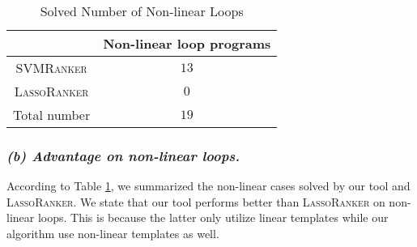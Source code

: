 \documentclass[UTF-8]{article}
\begin{document}
\begin{table}
\centering
\begin{tabular}{c|c}
& Non-linear loop programs \\
\hline
\textsc{SVMRanker} & $13$\\
\textsc{LassoRanker} & $0$\\
\hline
Total number & $19$  \\
\end{tabular}
\caption{Solved Number of Non-linear Loops}
\label{advantage_table}
\end{table}

\subsubsection{\textit{(b) Advantage on non-linear loops.}}
According to Table \ref{advantage_table}, we summarized the non-linear cases solved by our tool and \textsc{LassoRanker}. We state that our tool performs better than \textsc{LassoRanker} on non-linear loops. This is because the latter only utilize linear templates while our algorithm use non-linear templates as well.

{\color{blue}{lx: exp section is slightly long, to cut:xl}}
\end{document}

